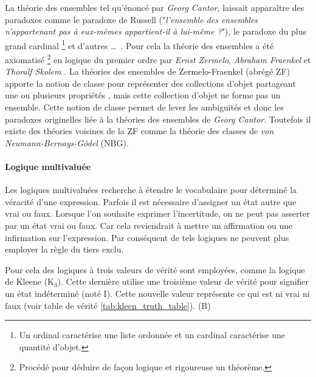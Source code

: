 \begin{refsegment}
\begin{shadedfigure}[!h]
    \end{shadedfigure}

    La théorie des ensembles tel qu'énoncé par \textit{Georg Cantor}, laissait apparaître des paradoxes comme le paradoxe de Russell ("\textit{l'ensemble des ensembles n'appartenant pas à eux-mêmes appartient-il à lui-même ?}"), le paradoxe du plus grand cardinal \footnote{Un ordinal caractérise une liste ordonnée et un cardinal caractérise une quantité d'objet.} et d'autres \ldots~. Pour cela la théorie des ensembles a été axiomatisé \footnote{Procédé pour déduire de façon logique et rigoureuse un théorème.} en logique du premier ordre par \textit{Ernst Zermelo}, \textit{ Abraham Fraenkel} et \textit{Thoralf Skolem} \cite{hayden1968zermelo,kanamori2008higher}. La théories des ensembles de Zermelo-Fraenkel (abrégé ZF) apporte la notion de classe pour représenter des collections d'objet partageant une ou plusieurs propriétés , mais cette collection d'objet ne forme pas un ensemble. Cette notion de classe permet de lever les ambiguïtés et donc les paradoxes originelles liée à la théories des ensembles de \textit{Georg Cantor}. Toutefois il existe des théories voisines de la ZF comme la théorie des classes \cite{bernays1937system,van1967frege} de \textit{von Neumann-Bernays-Gödel} (NBG).

        
    \paragraph{Logique multivaluée}
    
    Les logiques multivaluées recherche à étendre le vocabulaire pour déterminé la véracité d'une expression. Parfois il est nécessaire d'assigner un état autre que vrai ou faux. Lorsque l'on souhaite exprimer l'incertitude, on ne peut pas asserter par un état vrai ou faux. Car cela reviendrait à mettre un affirmation ou une infirmation sur l'expression. Par conséquent de tels logiques ne peuvent plus employer la règle du tiers exclu.
    
    Pour cela des logiques à trois valeurs de vérité sont employées, comme la logique de Kleene (K$_{3}$). Cette dernière utilise une troisième valeur de vérité pour signifier un état indéterminé (noté I). Cette nouvelle valeur représente ce qui est ni vrai ni faux (voir table de vérité \ref{tab:kleen_truth_table}). (B)
    

\end{refsegment}

